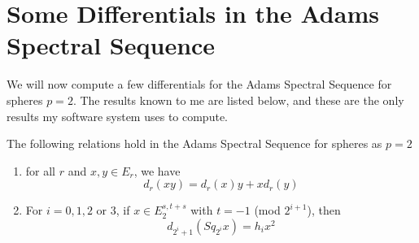 \section{Some Differentials in the Adams Spectral Sequence}

We will now compute a few differentials for the Adams Spectral Sequence for spheres $p=2$.  
The results known to me are listed below, and these are the only results my software system uses to compute.

\begin{Theorem}
  The following relations hold in the Adams Spectral Sequence for spheres as $p=2$
  \begin{enumerate}
    \item for all $r$ and $x,y\in E_r$, we have
      \[d_r(xy)=d_r(x)y+xd_r(y)\]
    \item For $i=0,1,2$ or $3$, if $x\in E_2^{s,t+s}$ with $t=-1$ (mod $2^{i+1}$), then
      \[d_{2^i+1}(Sq_{2^i}x)=h_ix^2\]
  \end{enumerate}
\end{Theorem}


